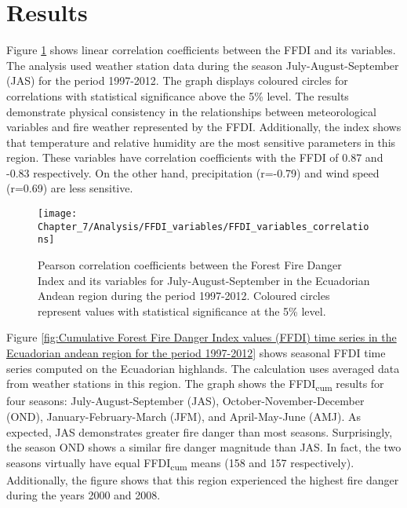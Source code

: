 \section{Results}

Figure \ref{fig:Pearson correlation coefficients between the Forest Fire Danger Index and its variables for July-August-September in the Ecuadorian andean region during the period 1997-2012.}
shows linear correlation coefficients between the FFDI and its variables.
The analysis used weather station data during the season July-August-September
(JAS) for the period 1997-2012. The graph displays coloured circles
for correlations with statistical significance above the 5\% level.
The results demonstrate physical consistency in the relationships
between meteorological variables and fire weather represented by the
FFDI. Additionally, the index shows that temperature and relative
humidity are the most sensitive parameters in this region. These variables
have correlation coefficients with the FFDI of 0.87 and -0.83 respectively.
On the other hand, precipitation (r=-0.79) and wind speed (r=0.69)
are less sensitive. 

\begin{figure}[h]
\noindent \begin{centering}
\texttt{[image: Chapter\_7/Analysis/FFDI\_variables/FFDI\_variables\_correlations]}
\par\end{centering}

\caption[Pearson correlation coefficients between the Forest Fire Danger Index
and its variables for July-August-September in the Ecuadorian Andean
region during the period 1997-2012]{Pearson correlation coefficients between the Forest Fire Danger Index
and its variables for July-August-September in the Ecuadorian Andean
region during the period 1997-2012. Coloured circles represent values
with statistical significance at the 5\% level. \label{fig:Pearson correlation coefficients between the Forest Fire Danger Index and its variables for July-August-September in the Ecuadorian andean region during the period 1997-2012.}}


\end{figure}


Figure \ref{fig:Cumulative Forest Fire Danger Index values (FFDI) time series in the Ecuadorian andean region for the period 1997-2012}
shows seasonal FFDI time series computed on the Ecuadorian highlands.
The calculation uses averaged data from weather stations in this region.
The graph shows the FFDI\textsubscript{cum} results for four seasons:
July-August-September (JAS), October-November-December (OND), January-February-March
(JFM), and April-May-June (AMJ). As expected, JAS demonstrates greater
fire danger than most seasons. Surprisingly, the season OND shows
a similar fire danger magnitude than JAS. In fact, the two seasons
virtually have equal FFDI\textsubscript{cum} means (158 and 157 respectively).
Additionally, the figure shows that this region experienced the highest
fire danger during the years 2000 and 2008. 

